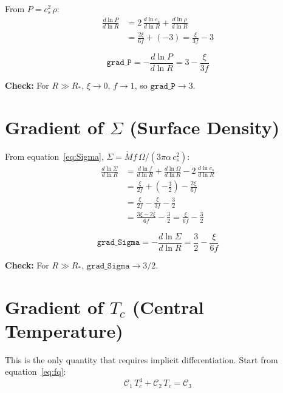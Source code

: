 \documentclass[11pt]{article}
\begin{document}
From $P = c_s^2\,\rho$:
\begin{align}
    \frac{d\ln P}{d\ln R}
    &= 2\,\frac{d\ln c_s}{d\ln R} + \frac{d\ln\rho}{d\ln R} \nonumber\\
    &= \frac{2\xi}{6f} + (-3) = \frac{\xi}{3f} - 3
\end{align}

\begin{equation}
    \boxed{\texttt{grad\_P} = -\frac{d\ln P}{d\ln R} = 3 - \frac{\xi}{3f}}
    \label{eq:gradP}
\end{equation}

\noindent\textbf{Check:} For $R \gg R_*$, $\xi \to 0$, $f \to 1$, so $\texttt{grad\_P} \to 3$.

\section{Gradient of $\Sigma$ (Surface Density)}

From equation~\eqref{eq:Sigma}, $\Sigma = \dot{M} f\, \Omega / (3\pi\alpha\, c_s^2)$:
\begin{align}
    \frac{d\ln\Sigma}{d\ln R}
    &= \frac{d\ln f}{d\ln R} + \frac{d\ln\Omega}{d\ln R} - 2\,\frac{d\ln c_s}{d\ln R} \nonumber\\
    &= \frac{\xi}{2f} + \left(-\frac{3}{2}\right) - \frac{2\xi}{6f} \nonumber\\
    &= \frac{\xi}{2f} - \frac{\xi}{3f} - \frac{3}{2} \nonumber\\
    &= \frac{3\xi - 2\xi}{6f} - \frac{3}{2} = \frac{\xi}{6f} - \frac{3}{2}
\end{align}

\begin{equation}
    \boxed{\texttt{grad\_Sigma} = -\frac{d\ln\Sigma}{d\ln R} = \frac{3}{2} - \frac{\xi}{6f}}
    \label{eq:gradSigma}
\end{equation}

\noindent\textbf{Check:} For $R \gg R_*$, $\texttt{grad\_Sigma} \to 3/2$.

\section{Gradient of $T_c$ (Central Temperature)}

This is the only quantity that requires implicit differentiation. Start from equation~\eqref{eq:fq}:
\[
    \mathcal{C}_1\, T_c^4 + \mathcal{C}_2\, T_c = \mathcal{C}_3
\]
\end{document}
